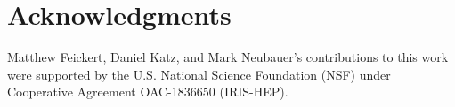 \section*{Acknowledgments}\label{sec:acknowledgments}
Matthew Feickert, Daniel Katz, and Mark Neubauer's contributions to this work were supported by the U.S. National Science Foundation (NSF) under Cooperative Agreement OAC-1836650 (IRIS-HEP).
